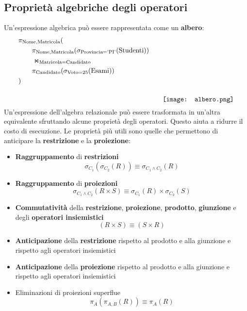 \subsection{Proprietà algebriche degli operatori}
Un'espressione algebrica può essere rappresentata come un \textbf{albero}:
\[
\begin{aligned}
	& \pi_{\text{Nome}, \text{Matricola}} (\\
	& \qquad \pi_{\text{Nome}, \text{Matricola}}(\sigma_{\text{Provincia} = \text{'PI'}}(\text{Studenti}))\\
	& \qquad \Join_{\text{Matricola} = \text{Candidato}} \\
	& \qquad \pi_{\text{Candidato}} (\sigma_{\text{Voto}=25}(\text{Esami})) \\
	&)
\end{aligned}
\qquad
\raisebox{-20mm}{\texttt{[image: albero.png]}}
\]
Un’espressione dell’algebra relazionale può essere trasformata in un’altra equivalente sfruttando alcune proprietà degli operatori. Questo aiuta a ridurre il costo di esecuzione. Le proprietà più utili sono quelle che permettono di anticipare la \textbf{restrizione} e la \textbf{proiezione}:
\begin{itemize}
	\item \textbf{Raggruppamento} di \textbf{restrizioni}
	\begin{equation*}
		\sigma_{C_1}(\sigma_{C_2}(R)) \equiv \sigma_{C_1 \land C_2}(R)
	\end{equation*}
	\item \textbf{Raggruppamento} di \textbf{proiezioni}
	\begin{equation*}
		\sigma_{C_1 \land C_2}(R \times S) \equiv\sigma_{C_1}(R) \times \sigma_{C_2}(S)
	\end{equation*}
	\item \textbf{Commutatività} della \textbf{restrizione}, \textbf{proiezione}, \textbf{prodotto}, \textbf{giunzione} e degli \textbf{operatori insiemistici}
	\begin{equation*}
		(R \times S) \equiv(S \times R)
	\end{equation*}
	\item \textbf{Anticipazione} della \textbf{restrizione} rispetto al prodotto e alla giunzione e rispetto agli operatori insiemistici
	\item \textbf{Anticipazione} della \textbf{proiezione} rispetto al prodotto e alla giunzione e rispetto agli operatori insiemistici
	\item Eliminazioni di proiezioni superflue
	\begin{equation*}
		\pi_{A}(\pi_{A,B}(R)) \equiv \pi_{A}(R)
	\end{equation*}
\end{itemize}

